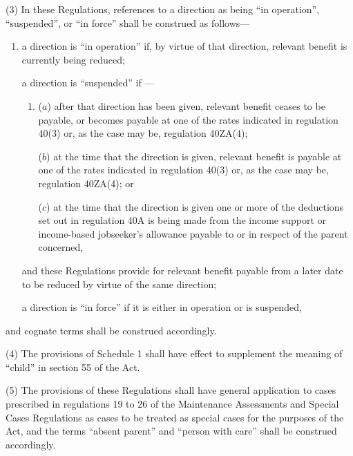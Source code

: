 \documentclass[a4paper,12pt]{article}
\begin{document}
(3) In these Regulations, references to a direction as being “in operation”, “suspended”, or “in force” shall be construed as follows—
\begin{enumerate}\item[]
a direction is “in operation” if, by virtue of that direction, relevant benefit is currently being reduced;

a direction is “suspended” if%
—
\begin{enumerate}\item[]
($a$) after that direction has been given, relevant benefit ceases to be payable, or becomes payable at one of the rates indicated in regulation 40(3)
or, as the case may be, regulation 40ZA(4);  %

($b$) at the time that the direction is given, relevant benefit is payable at one of the rates indicated in regulation 40(3)
or, as the case may be, regulation 40ZA(4);  %
or  %

($c$) at the time that the direction is given one or more of the deductions set out in regulation 40A is being made from the income support 
or income-based jobseeker’s allowance  %
payable to or in respect of the parent concerned,
\end{enumerate}
and these Regulations provide for relevant benefit payable from a later date to be reduced by virtue of the same direction;

a direction is “in force” if it is either in operation or is suspended,
\end{enumerate}
and cognate terms shall be construed accordingly.

(4) The provisions of Schedule 1 shall have effect to supplement the meaning of “child” in section 55 of the Act.

(5) The provisions of these Regulations shall have general application to cases prescribed in regulations 19 to 26 of the Maintenance Assessments and Special Cases Regulations as cases to be treated as special cases for the purposes of the Act, and the terms “absent parent” and “person with care” shall be construed accordingly.
\end{document}
